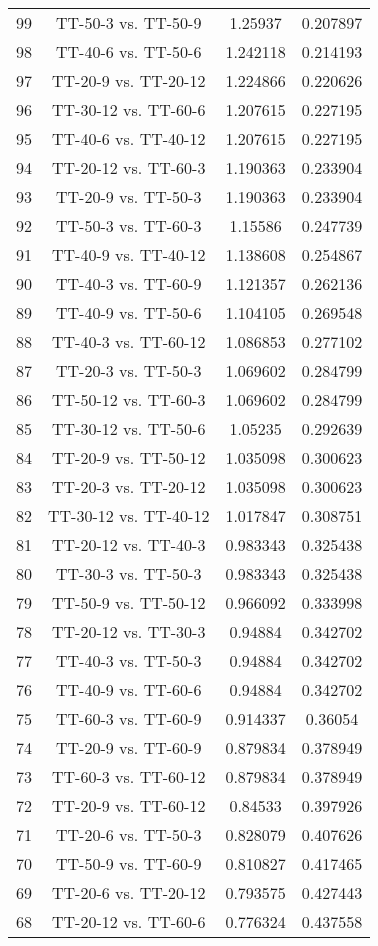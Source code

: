 \documentclass[a4paper,10pt]{article}
\begin{document}
\begin{landscape}
\begin{table}[!htp]
\begin{tabular}{cccc}
99&TT-50-3 vs. TT-50-9&1.25937&0.207897\\
98&TT-40-6 vs. TT-50-6&1.242118&0.214193\\
97&TT-20-9 vs. TT-20-12&1.224866&0.220626\\
96&TT-30-12 vs. TT-60-6&1.207615&0.227195\\
95&TT-40-6 vs. TT-40-12&1.207615&0.227195\\
94&TT-20-12 vs. TT-60-3&1.190363&0.233904\\
93&TT-20-9 vs. TT-50-3&1.190363&0.233904\\
92&TT-50-3 vs. TT-60-3&1.15586&0.247739\\
91&TT-40-9 vs. TT-40-12&1.138608&0.254867\\
90&TT-40-3 vs. TT-60-9&1.121357&0.262136\\
89&TT-40-9 vs. TT-50-6&1.104105&0.269548\\
88&TT-40-3 vs. TT-60-12&1.086853&0.277102\\
87&TT-20-3 vs. TT-50-3&1.069602&0.284799\\
86&TT-50-12 vs. TT-60-3&1.069602&0.284799\\
85&TT-30-12 vs. TT-50-6&1.05235&0.292639\\
84&TT-20-9 vs. TT-50-12&1.035098&0.300623\\
83&TT-20-3 vs. TT-20-12&1.035098&0.300623\\
82&TT-30-12 vs. TT-40-12&1.017847&0.308751\\
81&TT-20-12 vs. TT-40-3&0.983343&0.325438\\
80&TT-30-3 vs. TT-50-3&0.983343&0.325438\\
79&TT-50-9 vs. TT-50-12&0.966092&0.333998\\
78&TT-20-12 vs. TT-30-3&0.94884&0.342702\\
77&TT-40-3 vs. TT-50-3&0.94884&0.342702\\
76&TT-40-9 vs. TT-60-6&0.94884&0.342702\\
75&TT-60-3 vs. TT-60-9&0.914337&0.36054\\
74&TT-20-9 vs. TT-60-9&0.879834&0.378949\\
73&TT-60-3 vs. TT-60-12&0.879834&0.378949\\
72&TT-20-9 vs. TT-60-12&0.84533&0.397926\\
71&TT-20-6 vs. TT-50-3&0.828079&0.407626\\
70&TT-50-9 vs. TT-60-9&0.810827&0.417465\\
69&TT-20-6 vs. TT-20-12&0.793575&0.427443\\
68&TT-20-12 vs. TT-60-6&0.776324&0.437558\\

\end{tabular}
\end{table}
\end{landscape}
\end{document}
